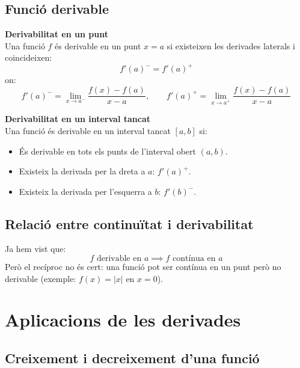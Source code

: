 \documentclass[12pt]{article}
\begin{document}
\subsection{Funció derivable}

\begin{concept}
\textbf{Derivabilitat en un punt}\\
Una funció $f$ és derivable en un punt $x=a$ si existeixen les derivades laterals i coincideixen:
\[
\boxed{f'(a)^- = f'(a)^+}
\]
on:
\[
f'(a)^- = \lim_{x\to a^-} \frac{f(x)-f(a)}{x-a}, \qquad
f'(a)^+ = \lim_{x\to a^+} \frac{f(x)-f(a)}{x-a}
\]

\textbf{Derivabilitat en un interval tancat}\\
Una funció és derivable en un interval tancat $[a,b]$ si:
\begin{itemize}
    \item És derivable en tots els punts de l'interval obert $(a,b)$.
    \item Existeix la derivada per la dreta a $a$: $f'(a)^+$.
    \item Existeix la derivada per l'esquerra a $b$: $f'(b)^-$.
\end{itemize}
\end{concept}

\subsection{Relació entre continuïtat i derivabilitat}

\begin{concept}
Ja hem vist que:
\[
\boxed{f \text{ derivable en } a \implies f \text{ contínua en } a}
\]
Però el recíproc no és cert: una funció pot ser contínua en un punt però no derivable (exemple: $f(x)=|x|$ en $x=0$).
\end{concept}


\section{Aplicacions de les derivades}

\subsection{Creixement i decreixement d'una funció}
\end{document}
